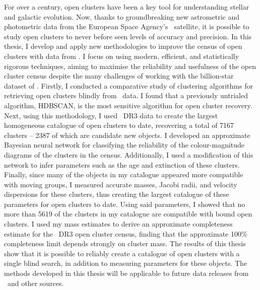 %

\label{sec:abstract}


For over a century, open clusters have been a key tool for understanding stellar and galactic evolution. 
Now, thanks to groundbreaking new astrometric and photometric data from the European Space Agency's \gaia\ satellite, it is possible to study open clusters to never before seen levels of accuracy and precision. 
In this thesis, I develop and apply new methodologies to improve the census of open clusters with data from \gaia. 
I focus on using modern, efficient, and statistically rigorous techniques, aiming to maximise the reliability and usefulness of the open cluster census despite the many challenges of working with the billion-star dataset of \gaia.
Firstly, I conducted a comparative study of clustering algorithms for retrieving open clusters blindly from \gaia\ data.
I found that a previously untrialed algorithm, HDBSCAN, is the most sensitive algorithm for open cluster recovery.
Next, using this methodology, I used \gaia\ DR3 data to create the largest homogeneous catalogue of open clusters to date, recovering a total of 7167 clusters -- 2387 of which are candidate new objects. 
I developed an approximate Bayesian neural network for classifying the reliability of the colour-magnitude diagrams of the clusters in the census. 
Additionally, I used a modification of this network to infer parameters such as the age and extinction of these clusters. 
Finally, since many of the objects in my catalogue appeared more compatible with moving groups, I measured accurate masses, Jacobi radii, and velocity dispersions for these clusters, thus creating the largest catalogue of these parameters for open clusters to date. 
Using said parameters, I showed that no more than 5619 of the clusters in my catalogue are compatible with bound open clusters. 
I used my mass estimates to derive an approximate completeness estimate for the \gaia\ DR3 open cluster census, finding that the approximate 100\% completeness limit depends strongly on cluster mass. 
The results of this thesis show that it is possible to reliably create a catalogue of open clusters with a single blind search, in addition to measuring parameters for these objects. 
The methods developed in this thesis will be applicable to future data releases from \gaia\ and other sources.


\newpage

